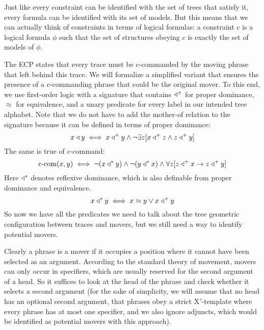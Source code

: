 Just like every constraint can be identified with the set of trees that satisfy it, every formula can be identified with its set of models.
But this means that we can actually think of constraints in terms of logical formulas: a constraint $c$ is a logical formula $\phi$ such that the set of structures obeying $c$ is exactly the set of models of $\phi$.
%
\begin{examplebox}
    The ECP states that every trace must be c-commanded by the moving phrase that left behind this trace.
    We will formalize a simplified variant that ensures the presence of a c-commanding phrase that could be the original mover.
    To this end, we use first-order logic with a signature that contains $\triangleleft^+$ for proper dominance, $\approx$ for equivalence, and a unary predicate for every label in our intended tree alphabet.
    Note that we do not have to add the mother-of relation to the signature because it can be defined in terms of proper dominance:
    \[
        x \triangleleft y \iff
            x \triangleleft^+ y
            \wedge
            \neg \exists z
                [x \triangleleft^+ z \wedge z \triangleleft^+ y]
    \]
    The same is true of c-command: 
    \[
        \text{c-com}(x,y) \iff
            \neg (x \triangleleft^* y)
            \wedge
            \neg (y \triangleleft^* x)
            \wedge
            \forall z [z \triangleleft^+ x \rightarrow z \triangleleft^+ y] 
    \]
    Here $\triangleleft^*$ denotes reflexive dominance, which is also definable from proper dominance and equivalence.
    \[
        x \triangleleft^* y \iff
            x \approx y
            \vee
            x \triangleleft^+ y
    \]
    So now we have all the predicates we need to talk about the tree geometric configuration between traces and movers, but we still need a way to identify potential movers.

    Clearly a phrase is a mover if it occupies a position where it cannot have been selected as an argument.
    According to the standard theory of movement, movers can only occur in specifiers, which are usually reserved for the second argument of a head.
    So it suffices to look at the head of the phrase and check whether it selects a second argument (for the sake of simplicity, we will assume that no head has an optional second argument, that phrases obey a strict X$'$-template where every phrase has at most one specifier, and we also ignore adjuncts, which would be identified as potential movers with this approach).


\end{examplebox}
